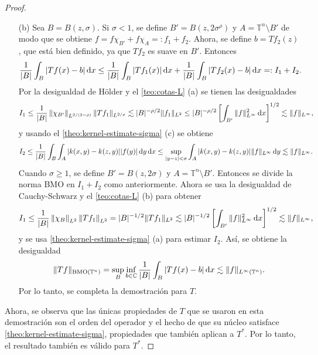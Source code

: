 \begin{proof}
\begin{itemize}
		\item[(b)] Sea $B = B(z, \sigma)$. Si $\sigma < 1$, se define $B'=B(z, 2\sigma^\rho)$ y $A = \mathbb{T}^n\setminus B'$ de modo que se obtiene $f = f\chi_{B'} + f\chi_A =: f_1 + f_2$. Ahora, se define $b = Tf_2(z)$, que está bien definido, ya que $Tf_2$ es suave en $B'$. Entonces 
		\begin{equation*}
			\frac{1}{|B|}\int_B|Tf(x) - b| \mathop{}\!\mathrm{d} x \leq \frac{1}{|B|}\int_B|Tf_1(x)|\mathop{}\!\mathrm{d} x + \frac{1}{|B|}\int_B|Tf_2(x) -b|\mathop{}\!\mathrm{d} x =: I_1 + I_2.
		\end{equation*}
		Por la desigualdad de H\"older y el \cref{teo:cotas-L} (a) se tienen las desigualdades
		\begin{equation*}
			I_1 \leq \frac{1}{|B|}\left\|\chi_{B'}\right\|_{L^{2/(2-\rho)}}\|Tf_1\|_{L^{2/\rho}}
			\lesssim |B|^{-\rho/2}\|f_1\|_{L^2} \leq |B|^{-\rho/2}\left[\int_{B'}\|f\|^2_{L^\infty}\mathop{}\!\mathrm{d} x\right]^{1/2} \lesssim  \|f\|_{L^\infty},
		\end{equation*}
		y usando el \cref{theo:kernel-estimate-sigma} (c) se obtiene 
		\begin{equation*}
			I_2 \leq \frac{1}{|B|}\int_B\int_A|k(x, y) - k(z, y)||f(y)|\mathop{}\!\mathrm{d} y \mathop{}\!\mathrm{d} x \leq \sup_{|y-z|<\sigma}\int_A|k(x, y) - k(z, y)|\|f\|_{L^\infty} \mathop{}\!\mathrm{d} y \lesssim \|f\|_{L^\infty}.
		\end{equation*}
		Cuando $\sigma \geq 1$, se define $B'=B(z, 2\sigma)$ y $A = \mathbb{T}^n\setminus B'$. Entonces se divide la norma BMO en $I_1 + I_2$ como anteriormente. Ahora se usa la desigualdad de Cauchy-Schwarz y el \cref{teo:cotas-L} (b) para obtener
		\begin{equation*}
			I_1 \leq\frac{1}{|B|} \left\|\chi_B\right\|_{L^2}\left\|Tf_1\right\|_{L^2} = |B|^{-1/2}\|Tf_1\|_{L^2} \lesssim |B|^{-1/2}\left[\int_{B'}\|f\|^2_{L^\infty}\mathop{}\!\mathrm{d} x\right]^{1/2} \lesssim  \|f\|_{L^\infty},
		\end{equation*}
		y se usa \cref{theo:kernel-estimate-sigma} (a) para estimar $I_2$. Así, se obtiene la desigualdad
		\begin{equation*}
			\|Tf\|_{\mathrm{BMO}(\mathbb{T}^n)} = \sup_B \inf_{b\in \mathbb{C}} \frac{1}{|B|} \int_B |Tf(x) - b|\mathop{}\!\mathrm{d} x \lesssim \|f\|_{L^\infty(\mathbb{T}^n)}.
		\end{equation*}
		Por lo tanto, se completa la demostración para $T$. 
	\end{itemize}  
	Ahora, se observa que las únicas propiedades de $T$ que se usaron en esta demostración son el orden del operador y el hecho de que su núcleo satisface \cref{theo:kernel-estimate-sigma}, propiedades que también aplican a $T^*$. Por lo tanto, el resultado también es válido para $T^*$.
\end{proof}
